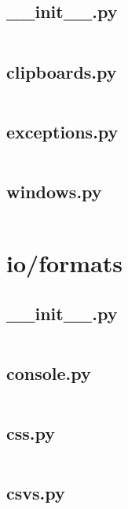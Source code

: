 \documentclass{article}
\begin{document}
\subsection{\_\_init\_\_.py}
\inputminted{python}{/home/dufferzafar/dev/@clones/pandas/pandas/io/clipboard/__init__.py}
\newpage

\subsection{clipboards.py}
\inputminted{python}{/home/dufferzafar/dev/@clones/pandas/pandas/io/clipboard/clipboards.py}
\newpage

\subsection{exceptions.py}
\inputminted{python}{/home/dufferzafar/dev/@clones/pandas/pandas/io/clipboard/exceptions.py}
\newpage

\subsection{windows.py}
\inputminted{python}{/home/dufferzafar/dev/@clones/pandas/pandas/io/clipboard/windows.py}
\newpage

\section{io/formats}

\subsection{\_\_init\_\_.py}
\inputminted{python}{/home/dufferzafar/dev/@clones/pandas/pandas/io/formats/__init__.py}
\newpage

\subsection{console.py}
\inputminted{python}{/home/dufferzafar/dev/@clones/pandas/pandas/io/formats/console.py}
\newpage

\subsection{css.py}
\inputminted{python}{/home/dufferzafar/dev/@clones/pandas/pandas/io/formats/css.py}
\newpage

\subsection{csvs.py}
\inputminted{python}{/home/dufferzafar/dev/@clones/pandas/pandas/io/formats/csvs.py}
\newpage
\end{document}
